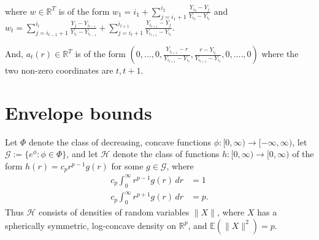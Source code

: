 \documentclass[12pt]{article}
\DeclareMathOperator*{\argmax}{argmax}
\begin{document}
where $w \in \mathbb{R}^T$ is of the form $w_1 = i_1 + \sum_{j=i_1+1}^{i_2} \frac{Y_{i_2} - Y_j}{Y_{i_2} - Y_{i_1}} $ and $w_t = \sum_{j=i_{t-1}+1}^{i_t} \frac{Y_j - Y_{i_{t-1}}}{Y_{i_t} - Y_{i_{t-1}}} +  \sum_{j=i_t+1}^{i_{t+1}} \frac{Y_{i_{t+1}} - Y_j}{Y_{i_{t+1}} - Y_{i_t}}$.

And, $a_t(r) \in \mathbb{R}^T$ is of the form $(0,...,0, \frac{Y_{i_{t+1}} - r}{Y_{i_{t+1}} - Y_{i_t}}, 
\frac{r - Y_{i_t}}{Y_{i_{t+1}} - Y_{i_t}}, 0, ...., 0)$ where the two non-zero coordinates are $t, t+1$. 




\section{Envelope bounds}

Let $\Phi$ denote the class of decreasing, concave functions $\phi:[0,\infty) \rightarrow [-\infty,\infty)$, let $\mathcal{G} := \{e^\phi:\phi \in \Phi\}$, and let $\mathcal{H}$ denote the class of functions $h:[0,\infty) \rightarrow [0,\infty)$ of the form $h(r) = c_pr^{p-1}g(r)$ for some $g \in \mathcal{G}$, where
\begin{align}
\label{Eq:Moment1} c_p \int_0^\infty r^{p-1}g(r) \, dr &= 1 \\
\label{Eq:Moment2} c_p \int_0^\infty r^{p+1}g(r) \, dr &= p.
\end{align}
Thus $\mathcal{H}$ consists of densities of random variables $\|X\|$, where $X$ has a spherically symmetric, log-concave density on $\mathbb{R}^p$, and $\mathbb{E}(\|X\|^2) = p$.
\end{document}
